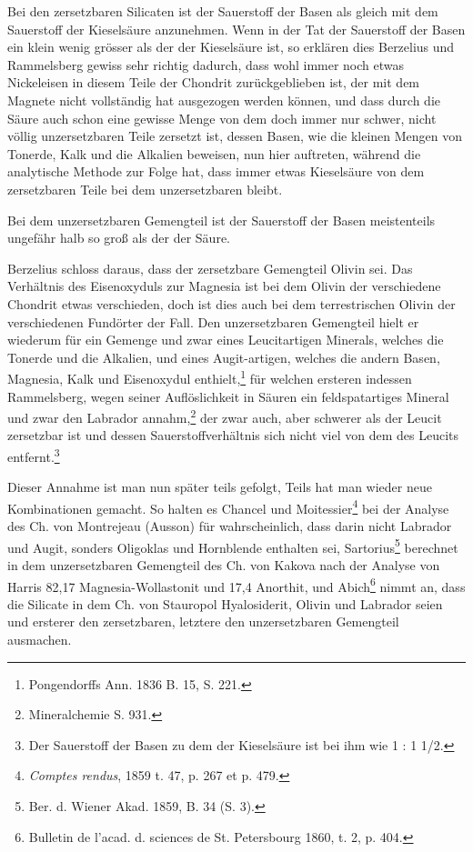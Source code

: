 \documentclass[a4paper, 11pt, oneside]{article}
\begin{document}
Bei den zersetzbaren Silicaten ist der Sauerstoff der Basen als gleich mit dem Sauerstoff der Kieselsäure anzunehmen. Wenn in der Tat der Sauerstoff der Basen ein klein wenig grösser als der der Kieselsäure ist, so erklären dies Berzelius und Rammelsberg gewiss sehr richtig dadurch, dass wohl immer noch etwas Nickeleisen in diesem Teile der Chondrit zurückgeblieben ist, der mit dem Magnete nicht vollständig hat ausgezogen werden können, und dass durch die Säure auch schon eine gewisse Menge von dem doch immer nur schwer, nicht völlig unzersetzbaren Teile zersetzt ist, dessen Basen, wie die kleinen Mengen von Tonerde, Kalk und die Alkalien beweisen, nun hier auftreten, während die analytische Methode zur Folge hat, dass immer etwas Kieselsäure von dem zersetzbaren Teile bei dem unzersetzbaren bleibt.

Bei dem unzersetzbaren Gemengteil ist der Sauerstoff der Basen meistenteils ungefähr halb so groß als der der Säure.

Berzelius schloss daraus, dass der zersetzbare Gemengteil Olivin sei. Das Verhältnis des Eisenoxyduls zur Magnesia ist bei dem Olivin der verschiedene Chondrit etwas verschieden, doch ist dies auch bei dem terrestrischen Olivin der verschiedenen Fundörter der Fall. Den unzersetzbaren Gemengteil hielt er wiederum für ein Gemenge und zwar eines Leucitartigen Minerals, welches die Tonerde und die Alkalien, und eines Augit-artigen, welches die andern Basen, Magnesia, Kalk und Eisenoxydul enthielt,\footnote{Pongendorffs Ann. 1836 B. 15, S. 221.} für welchen ersteren indessen Rammelsberg, wegen seiner Auflöslichkeit in Säuren ein feldspatartiges Mineral und zwar den Labrador annahm,\footnote{Mineralchemie S. 931.} der zwar auch, aber schwerer als der Leucit zersetzbar ist und dessen Sauerstoffverhältnis sich nicht viel von dem des Leucits entfernt.\footnote{Der Sauerstoff der Basen zu dem der Kieselsäure ist bei ihm wie 1 : 1 1/2.}

Dieser Annahme ist man nun später teils gefolgt, Teils hat man wieder neue Kombinationen gemacht. So halten es Chancel und Moitessier\footnote{\emph{Comptes rendus}, 1859 t. 47, p. 267 et p. 479.} bei der Analyse des Ch. von Montrejeau (Ausson) für wahrscheinlich, dass darin nicht Labrador und Augit, sonders Oligoklas und Hornblende enthalten sei, Sartorius\footnote{Ber. d. Wiener Akad. 1859, B. 34 (S. 3).} berechnet in dem unzersetzbaren Gemengteil des Ch. von Kakova nach der Analyse von Harris 82,17 Magnesia-Wollastonit und 17,4 Anorthit, und Abich\footnote{Bulletin de l'acad. d. sciences de St. Petersbourg 1860, t. 2, p. 404.} nimmt an, dass die Silicate in dem Ch. von Stauropol Hyalosiderit, Olivin und Labrador seien und ersterer den zersetzbaren, letztere den unzersetzbaren Gemengteil ausmachen.
\end{document}
